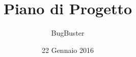 




\title{\textbf{Piano di Progetto}}
\author{BugBuster}

\date{22 Gennaio 2016}




\makeFrontPage

\tableofcontents





